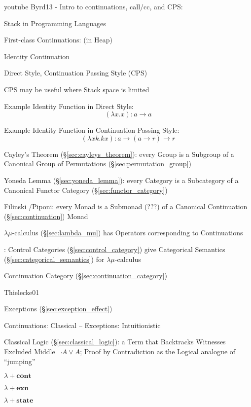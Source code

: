 \asterism


youtube Byrd13 - Intro to continuations, call/cc, and CPS:

Stack in Programming Languages

First-class Continuations: (in Heap) %

Identity Continuation


\asterism


Direct Style, Continuation Passing Style (CPS)

CPS may be useful where Stack space is limited

Example Identity Function in Direct Style:
\[
  (\lambda x . x) : a \rightarrow a
\]

Example Identity Function in Continuation Passing Style:
\[
  (\lambda x k.k x) : a \rightarrow (a \rightarrow r) \rightarrow r
\]

Cayley's Theorem (\S\ref{sec:cayleys_theorem}): every Group is a
Subgroup of a Canonical Group of Permutations
(\S\ref{sec:permutation_group})

Yoneda Lemma (\S\ref{sec:yoneda_lemma}): every Category is a
Subcategory of a Canonical Functor Category
(\S\ref{sec:functor_category})

Filinski \cite{filinski99}/Piponi: every Monad is a Submonad (???) of
a Canonical Continuation (\S\ref{sec:continuation}) Monad


\asterism


$\lambda\mu$-calculus (\S\ref{sec:lambda_mu}) has Operators
corresponding to Continuations

\cite{selinger01}: Control Categories (\S\ref{sec:control_category})
give Categorical Semantics (\S\ref{sec:categorical_semantics}) for
$\lambda\mu$-calculus

Continuation Category (\S\ref{sec:continuation_category})


\asterism


Thielecke01 %

Exceptions (\S\ref{sec:exception_effect})

Continuations: Classical -- Exceptions: Intuitionistic

Classical Logic (\S\ref{sec:classical_logic}): a Term that Backtracks
Witnesses Excluded Middle $\neg A \vee A$; Proof by Contradiction as
the Logical analogue of ``jumping''

$\lambda + \mathbf{cont}$

$\lambda + \mathbf{exn}$

$\lambda + \mathbf{state}$

